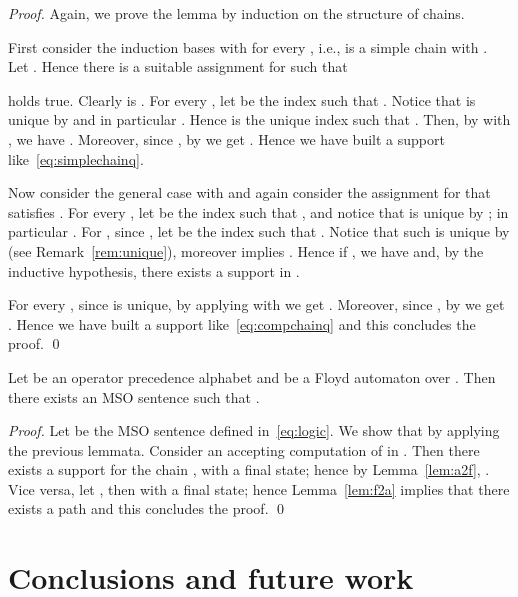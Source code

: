 \documentclass[10pt,a4paper,runningheads]{llncs}
\begin{document}
\begin{proof}
Again, we prove the lemma by induction on the structure of chains. 
\smallskip

First consider the induction bases with  for every , i.e.,  is a simple chain with .
Let . Hence there is a suitable assignment for  such that
 
holds true. 
Clearly  is .
For every , let  be the index such that . 
Notice that  is unique by  and in particular .
Hence  is the unique index such that .
Then, by  with , we have .
Moreover, since , by  we get . Hence we
have built a support like~\eqref{eq:simplechainq}.

 
\smallskip

Now consider the general case with 
and again consider the assignment for  that satisfies
.
For every , let  be the index such that , and notice
that  is unique by ;
in particular .
For , since ,
let  be the index such that .
Notice that such  is unique by  (see
Remark~\ref{rem:unique}), moreover  implies .
Hence if , we have  and, by the inductive hypothesis, there exists a support
 in .


For every , since  is unique, by applying
 with  we get .
Moreover, since ,
by  we get . Hence we have
built a support like~\eqref{eq:compchainq} and this concludes the proof.
\qed
\end{proof}





\begin{proposition}
\label{prop:logic:f2a}
Let  be an operator precedence alphabet and 
be a Floyd automaton over . Then there exists an
MSO sentence  such that .
\end{proposition}

\begin{proof} 
  Let  be the MSO sentence defined
  in~\eqref{eq:logic}. We show that  by
  applying the previous lemmata.
Consider an accepting computation of  in . Then there
exists a support  for the chain , with  a final state; hence by Lemma~\ref{lem:a2f}, .
Vice versa, let , then  with  a final state; hence Lemma~\ref{lem:f2a} implies
that there exists a path  and this concludes the proof.
\qed
\end{proof}


\section{Conclusions and future work}\label{sec:concl}
\end{document}
